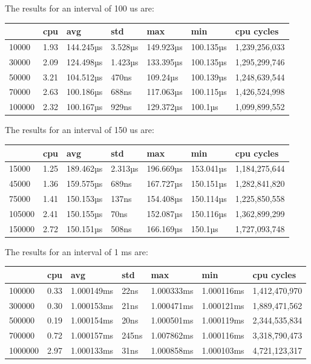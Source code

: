 \documentclass{article}
\begin{document}
The results for an interval of 100 us are: \\
\begin{tabular}{lllllll}
\toprule
 & cpu & avg & std & max & min & cpu cycles \\
\midrule
10000 & 1.93 & 144.245µs & 3.528µs & 149.923µs & 100.135µs & 1,239,256,033 \\
30000 & 2.09 & 124.498µs & 1.423µs & 133.395µs & 100.135µs & 1,295,299,746 \\
50000 & 3.21 & 104.512µs & 470ns & 109.24µs & 100.139µs & 1,248,639,544 \\
70000 & 2.63 & 100.186µs & 688ns & 117.063µs & 100.115µs & 1,426,524,998 \\
100000 & 2.32 & 100.167µs & 929ns & 129.372µs & 100.1µs & 1,099,899,552 \\
\bottomrule
\end{tabular}


The results for an interval of 150 us are: \\
\begin{tabular}{lllllll}
\toprule
 & cpu & avg & std & max & min & cpu cycles \\
\midrule
15000 & 1.25 & 189.462µs & 2.313µs & 196.669µs & 153.041µs & 1,184,275,644 \\
45000 & 1.36 & 159.575µs & 689ns & 167.727µs & 150.151µs & 1,282,841,820 \\
75000 & 1.41 & 150.153µs & 137ns & 154.408µs & 150.114µs & 1,225,850,558 \\
105000 & 2.41 & 150.155µs & 70ns & 152.087µs & 150.116µs & 1,362,899,299 \\
150000 & 2.72 & 150.151µs & 508ns & 166.169µs & 150.1µs & 1,727,093,748 \\
\bottomrule
\end{tabular}


The results for an interval of 1 ms are: \\
\begin{tabular}{lllllll}
\toprule
 & cpu & avg & std & max & min & cpu cycles \\
\midrule
100000 & 0.33 & 1.000149ms & 22ns & 1.000333ms & 1.000116ms & 1,412,470,970 \\
300000 & 0.30 & 1.000153ms & 21ns & 1.000471ms & 1.000121ms & 1,889,471,562 \\
500000 & 0.19 & 1.000154ms & 20ns & 1.000501ms & 1.000119ms & 2,344,535,834 \\
700000 & 0.72 & 1.000157ms & 245ns & 1.007862ms & 1.000116ms & 3,318,790,473 \\
1000000 & 2.97 & 1.000133ms & 31ns & 1.000858ms & 1.000103ms & 4,721,123,317 \\
\bottomrule
\end{tabular}
\end{document}
